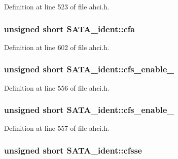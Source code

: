 Definition at line 523 of file ahci.\+h.

\subsubsection[{\texorpdfstring{cfa}{cfa}}]{\setlength{\rightskip}{0pt plus 5cm}unsigned short S\+A\+T\+A\+\_\+ident\+::cfa}\hypertarget{structSATA__ident_a73387dc40b352ee650bd1a5875849e08}{}\label{structSATA__ident_a73387dc40b352ee650bd1a5875849e08}


Definition at line 602 of file ahci.\+h.

\subsubsection[{\texorpdfstring{cfs\+\_\+enable\+\_\+1}{cfs_enable_1}}]{\setlength{\rightskip}{0pt plus 5cm}unsigned short S\+A\+T\+A\+\_\+ident\+::cfs\+\_\+enable\+\_}\hypertarget{structSATA__ident_acb6d9e0d24967112a83d6e195f77469a}{}\label{structSATA__ident_acb6d9e0d24967112a83d6e195f77469a}


Definition at line 556 of file ahci.\+h.

\subsubsection[{\texorpdfstring{cfs\+\_\+enable\+\_\+2}{cfs_enable_2}}]{\setlength{\rightskip}{0pt plus 5cm}unsigned short S\+A\+T\+A\+\_\+ident\+::cfs\+\_\+enable\+\_}\hypertarget{structSATA__ident_af76747e91afd940fbe5c4c05ee0b6396}{}\label{structSATA__ident_af76747e91afd940fbe5c4c05ee0b6396}


Definition at line 557 of file ahci.\+h.

\subsubsection[{\texorpdfstring{cfsse}{cfsse}}]{\setlength{\rightskip}{0pt plus 5cm}unsigned short S\+A\+T\+A\+\_\+ident\+::cfsse}\hypertarget{structSATA__ident_a9d98244646733dfe714c46d0e8a58ecd}{}\label{structSATA__ident_a9d98244646733dfe714c46d0e8a58ecd}


